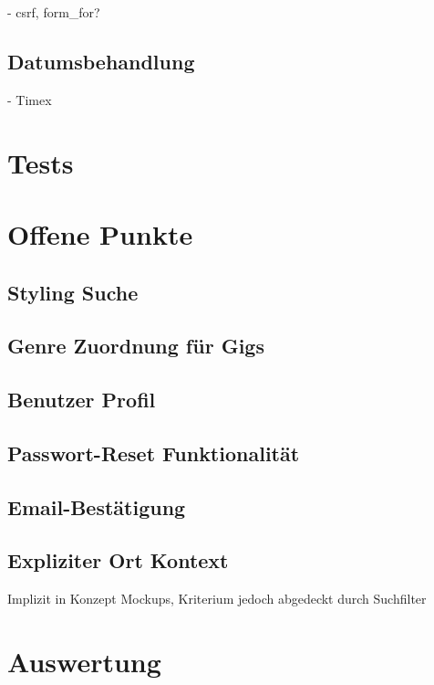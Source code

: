 - csrf, form\_for?

\subsection{Datumsbehandlung}

- Timex

\clearpage
\section{Tests}

\clearpage
\section{Offene Punkte}

\subsection{Styling Suche}
\subsection{Genre Zuordnung für Gigs}
\subsection{Benutzer Profil}
\subsection{Passwort-Reset Funktionalität}
\subsection{Email-Bestätigung}
\subsection{Expliziter Ort Kontext}

Implizit in Konzept Mockups, Kriterium jedoch abgedeckt durch Suchfilter

\section{Auswertung}
